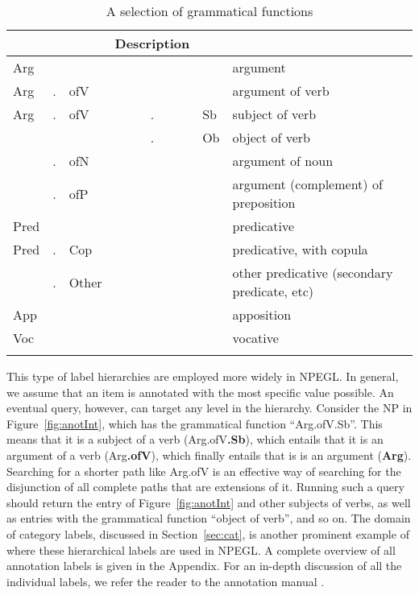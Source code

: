 \documentclass[output=paper,colorlinks,citecolor=brown]{langscibook}
\begin{document}
\begin{table}
\begin{tabular}{l@{~~}c@{~~}l@{~~}c@{~~}ll}
\lsptoprule
\multicolumn{3}{l}{Label} & & & Description\\
\midrule
Arg &   &       &   &    & argument\\
Arg & . & ofV   &   &    & argument of verb\\
Arg & . & ofV   & . & Sb & subject of verb\\
    &   &      & . & Ob & object of verb\\
    & . & ofN   &  &     & argument of noun \\
    & . & ofP   &   &    & argument (complement) of preposition \\\addlinespace
Pred&   &       &   &    & predicative\\    
Pred& . & Cop   &   &    & predicative, with copula\\
    & . & Other &   &    & other predicative (secondary predicate, etc)\\\addlinespace
App &   &      &   &    & apposition \\\addlinespace
Voc &   &      &   &    & vocative \\
\lspbottomrule
\end{tabular}
\caption{A selection of grammatical functions\label{tab:Syntac}}
\end{table}

This type of label hierarchies are employed more widely in NPEGL. 
In general, we assume that an item is annotated with the most specific value possible. An eventual query, however, can target any level in the hierarchy. Consider the NP in Figure~\ref{fig:anotInt}, which has the grammatical function ``Arg.ofV.Sb''. This means that it is a subject of a verb (Arg.ofV\textbf{.Sb}), which entails that it is an argument of a verb  (Arg\textbf{.ofV}), which finally entails that is is an argument (\textbf{Arg}). Searching for a shorter path like Arg.ofV is an effective way of searching for the disjunction of all complete paths that are extensions of it. Running such a query should return the entry of Figure~\ref{fig:anotInt} and other subjects of verbs, as well as entries with the grammatical function ``object of verb'', and so on. The domain of category labels, discussed in Section~\ref{sec:cat}, is another prominent example of where these hierarchical labels are used in NPEGL. A complete overview of all annotation labels is given in the Appendix. %
For an in-depth discussion of all the individual labels, we refer the reader to the annotation manual \citep{Pfaff2019Annot}. 
\end{document}
